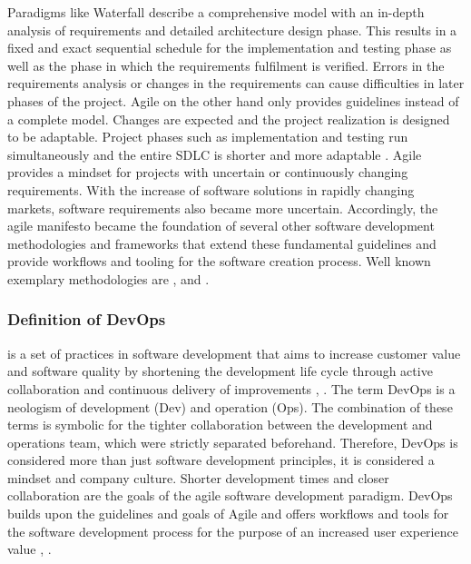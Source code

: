         \noindent Paradigms like Waterfall describe a comprehensive model with an in-depth analysis of requirements and detailed architecture design phase. This results in a fixed and exact sequential schedule for the implementation and testing phase as well as the phase in which the requirements fulfilment is verified. Errors in the requirements analysis or changes in the requirements can cause difficulties in later phases of the project. Agile on the other hand only provides guidelines instead of a complete model. Changes are expected and the project realization is designed to be adaptable. Project phases such as implementation and testing run simultaneously and the entire \ac{SDLC} is shorter and more adaptable \cite{agile_practice}.\newline
        Agile provides a mindset for projects with uncertain or continuously changing requirements. With the increase of software solutions in rapidly changing markets, software requirements also became more uncertain. Accordingly, the agile manifesto became the foundation of several other software development methodologies and frameworks that extend these fundamental guidelines and provide workflows and tooling for the software creation process. Well known exemplary methodologies are ,  and .

        \subsubsection{Definition of DevOps}
         is a set of practices in software development that aims to increase customer value and software quality by shortening the development life cycle through active collaboration and continuous delivery of improvements \cite{base_devops}, \cite{effective_devops}. The term DevOps is a neologism of development (Dev) and operation (Ops). The combination of these terms is symbolic for the tighter collaboration between the development and operations team, which were strictly separated beforehand. Therefore, DevOps is considered more than just software development principles, it is considered a mindset and company culture. Shorter development times and closer collaboration are the goals of the agile software development paradigm. DevOps builds upon the guidelines and goals of Agile and offers workflows and tools for the software development process for the purpose of an increased user experience value \cite{azuredevops}, \cite{effective_devops}.

